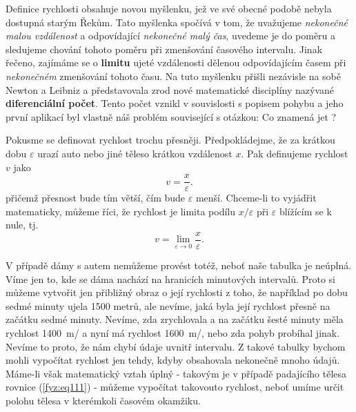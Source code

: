     Definice rychlosti obsahuje novou myšlenku, jež ve své obe\-cné podobě nebyla dostupná starým 
    Řekům. Tato myšlenka spočívá v tom, že uvažujeme \emph{nekonečné malou vzdálenost} a 
    odpovídající \emph{nekonečné malý čas}, uvedeme je do poměru a sledujeme chování tohoto poměru 
    při zmenšování časového intervalu. Jinak řečeno, zajímáme se o \textbf{limitu} ujeté 
    vzdálenosti dělenou odpovídajícím časem při \emph{nekonečném} zmenšování tohoto času. Na tuto 
    myšlenku přišli nezávisle na sobě Newton a Leibniz a představovala zrod nové matematické 
    disciplíny nazývané \textbf{diferenciální počet}. Tento počet vznikl v souvislosti s popisem 
    pohybu a jeho první aplikací byl vlastně náš problém související s otázkou: Co znamená jet 
    ?

    Pokusme se definovat rychlost trochu přesněji. Předpokládejme, že za krátkou dobu 
    \(\varepsilon\) urazí auto nebo jiné těleso krátkou vzdálenost \(x\). Pak definujeme rychlost 
    \(v\) jako
    \begin{equation}\label{fyz:eq113}
      v = \frac{x}{\varepsilon}.
    \end{equation}
    přičemž přesnost bude tím větší, čím bude \(\varepsilon\) menší. Chceme-li to vyjádřit 
    matematicky, můžeme říci, že rychlost je limita podílu \(x/\varepsilon\) při \(\varepsilon\) 
    blížícím se k nule, tj.
    \begin{equation}\label{fyz:eq114}
      v = \lim_{\varepsilon\to 0}{\frac{x}{\varepsilon}}.
    \end{equation}
    
    V případě dámy s autem nemůžeme provést totéž, neboť naše tabulka je neúplná. Víme jen to, kde 
    se dáma nachází na hranicích minutových intervalů. Proto si můžeme vytvořit jen přibližný obraz 
    o její rychlosti z toho, že například po dobu sedmé minuty ujela \num{1500} metrů, ale nevíme, 
    jaká byla její rychlost přesně na začátku sedmé minuty. Nevíme, zda zrychlovala a na začátku 
    šesté minuty měla rychlost \SI{1400}{\m/\min} a nyní má rychlost \SI{1600}{\m/\min}, nebo zda 
    pohyb probíhal jinak. Nevíme to proto, že nám chybí údaje uvnitř intervalu. Z takové tabulky 
    bychom mohli vypočítat rychlost jen tehdy, kdyby obsahovala nekonečně mnoho údajů. Máme-li však 
    matematický vztah úplný - takovým je v případě padajícího tělesa rovnice (\ref{fyz:eq111}) - 
    můžeme vypočítat takovouto rychlost, neboť umíme určit polohu tělesa v kterémkoli časovém 
    okamžiku.
    

